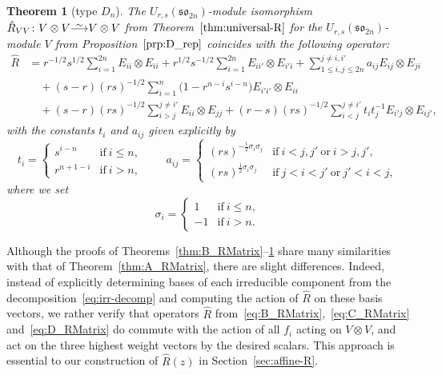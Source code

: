 \documentclass[pdftex]{sigma}
\numberwithin{equation}{section}
\newtheorem{Theorem}{Theorem}[section]
\newcommand{\sso}{\mathfrak{so}}
\newcommand\iso{ \vphantom{j^{X^2}}\smash{\overset{\sim}{\vphantom{\rule{0pt}{0.20em}}\smash{\longrightarrow}}} }
\begin{document}
\begin{Theorem}[type $D_{n}$]\label{thm:D_RMatrix}
The $U_{r,s}(\sso_{2n})$-module isomorphism $\hat{R}_{VV}\colon V \otimes V \iso V \otimes V$ from Theorem~$\ref{thm:universal-R}$ for the $U_{r,s}(\sso_{2n})$-module $V$ from Proposition~$\ref{prp:D_rep}$ coincides with the following operator:
\begin{align}
 \hat{R} &{}=
 r^{-1/2}s^{1/2}\sum_{i = 1}^{2n} E_{ii} \otimes E_{ii}
 + r^{1/2}s^{-1/2}\sum_{i = 1}^{2n}E_{ii'} \otimes E_{i'i}+ \sum_{1\leq i,j\leq 2n}^{j \neq i,i'} a_{ij}E_{ij} \otimes E_{ji} \nonumber\\
 &\quad{}
 + (s - r)(rs)^{-1/2}\sum_{i = 1}^{n} \bigl(1 - r^{n- i}s^{i - n}\bigr) E_{i'i'} \otimes E_{ii} \nonumber\\
 &\quad{} + (s -r)(rs)^{-1/2}\sum_{i > j}^{j \neq i'} E_{ii} \otimes E_{jj}
 + (r - s)(rs)^{-1/2}\sum_{i < j}^{j \neq i'} t_{i}t_{j}^{-1}E_{i'j} \otimes E_{ij'} ,\label{eq:D_RMatrix}
 \end{align}
with the constants $t_i$ and $a_{ij}$ given explicitly by
\begin{equation}\label{eq:D_coeffs}
 t_{i} =
 \begin{cases}
 s^{i - n} & \text{if}\ i \le n, \\
 r^{n + 1 - i} & \text{if}\ i > n,
 \end{cases} \qquad
 a_{ij} =
 \begin{cases}
 (rs)^{-\frac{1}{2}\sigma_{i}\sigma_{j}} & \text{if}\ i < j,j'\ \text{or}\ i > j,j', \\
 (rs)^{\frac{1}{2}\sigma_{i}\sigma_{j}} & \text{if}\ j < i < j'\ \text{or}\ j' < i < j,
 \end{cases}
\end{equation}
where we set
\begin{displaymath}
 \sigma_{i} =
 \begin{cases}
 1 & \text{if}\ i \le n, \\
 -1 & \text{if}\ i > n.
 \end{cases}
\end{displaymath}
\end{Theorem}


\begin{Remark}
Although the proofs of Theorems~\ref{thm:B_RMatrix}--\ref{thm:D_RMatrix} share many similarities with that of Theorem~\ref{thm:A_RMatrix}, there are slight differences. Indeed, instead of explicitly determining bases of each irreducible component from the decomposition~\eqref{eq:irr-decomp} and computing the action of $\hat{R}$ on these basis vectors, we rather verify that operators $\hat{R}$ from~\eqref{eq:B_RMatrix},~\eqref{eq:C_RMatrix} and~\eqref{eq:D_RMatrix} do commute with the action of all $f_i$ acting on $V\otimes V$, and act on the three highest weight vectors by the desired scalars. This approach is essential to our construction of $\hat{R}(z)$ in Section~\ref{sec:affine-R}.
\end{Remark}
\end{document}
